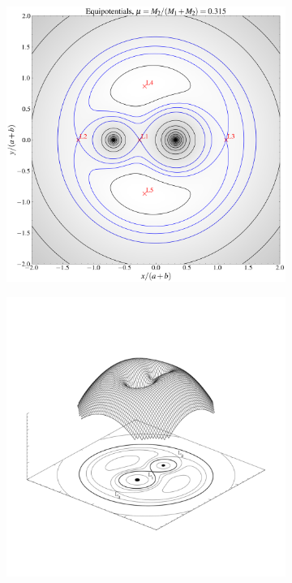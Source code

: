 \documentclass[main.tex]{subfiles}
\begin{document}
    \begin{figure}[t!]
        \centering
        \begin{subfigure}{0.45\textwidth}
            \centering
             \includegraphics[width=\columnwidth]{figures/chapter1/equipotentials_mu_0.315.png} 
        \end{subfigure}
        \begin{subfigure}{0.535\textwidth}
            \centering
            \includegraphics[width=\columnwidth]{figures/chapter1/3Dequipotentials_transparent.png} 

\end{subfigure}
\end{figure}
\end{document}
